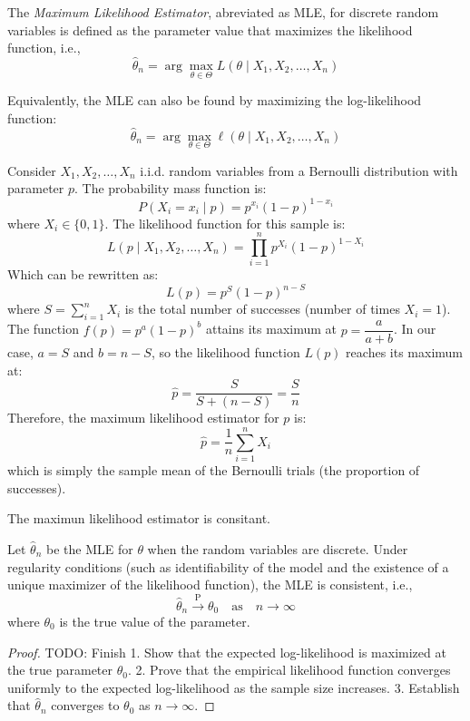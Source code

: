 \begin{definition}
The \emph{Maximum Likelihood Estimator}, abreviated as MLE, for discrete random variables is defined as the parameter value that maximizes the likelihood function, i.e.,
\[
\hat{\theta}_n = \arg \max_{\theta \in \Theta} L(\theta \mid X_1, X_2, \dots, X_n)
\]
\end{definition}

Equivalently, the MLE can also be found by maximizing the log-likelihood function:
\[
\hat{\theta}_n = \arg \max_{\theta \in \Theta} \ell(\theta \mid X_1, X_2, \dots, X_n)
\]

\begin{example}
Consider \( X_1, X_2, \dots, X_n \) i.i.d. random variables from a Bernoulli distribution with parameter \( p \). The probability mass function is:
\[
P(X_i = x_i \mid p) = p^{x_i}(1 - p)^{1 - x_i}
\]
where \( X_i \in \{0, 1\} \). The likelihood function for this sample is:
\[
L(p \mid X_1, X_2, \dots, X_n) = \prod_{i=1}^{n} p^{X_i}(1 - p)^{1 - X_i}
\]
Which can be rewritten as:
\[
L(p) = p^S (1 - p)^{n - S}
\]
where \( S = \sum_{i=1}^{n} X_i \) is the total number of successes (number of times \( X_i = 1 \)).  The function \( f(p) = p^a (1 - p)^b \) attains its maximum at \( p = \dfrac{a}{a + b} \). In our case, \( a = S \) and \( b = n - S \), so the likelihood function \( L(p) \) reaches its maximum at:
\[
\hat{p} = \dfrac{S}{S + (n - S)} = \dfrac{S}{n}
\]
Therefore, the maximum likelihood estimator for \( p \) is:
\[
\hat{p} = \dfrac{1}{n} \sum_{i=1}^{n} X_i
\]
which is simply the sample mean of the Bernoulli trials (the proportion of successes).
\end{example}

The maximun likelihood estimator is consitant.

\begin{proposition}
Let \( \hat{\theta}_n \) be the MLE for \( \theta \) when the random variables are discrete. Under regularity conditions (such as identifiability of the model and the existence of a unique maximizer of the likelihood function), the MLE is consistent, i.e.,
\[
\hat{\theta}_n \xrightarrow{\text{P}} \theta_0 \quad \text{as} \quad n \to \infty
\]
where \( \theta_0 \) is the true value of the parameter.
\end{proposition}
\begin{proof}
{\color{red} TODO: Finish}
1. Show that the expected log-likelihood is maximized at the true parameter \( \theta_0 \).
2. Prove that the empirical likelihood function converges uniformly to the expected log-likelihood as the sample size increases.
3. Establish that \( \hat{\theta}_n \) converges to \( \theta_0 \) as \( n \to \infty \).
\end{proof}

